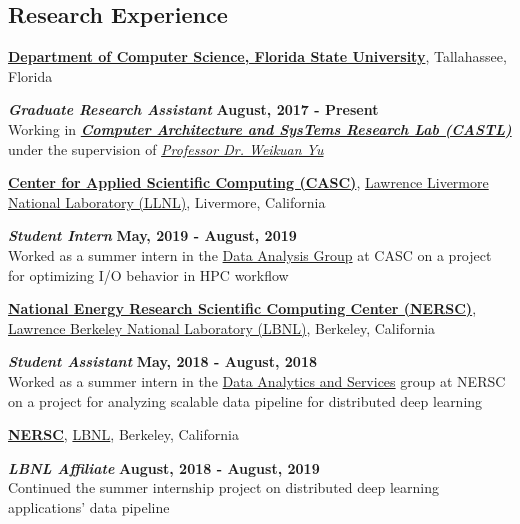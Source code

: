 \documentclass[margin,line]{res}
\begin{document}
\begin{resume}
\vspace*{-.1in}

\section{\sc Research Experience}
{\bf \href{http://www.cs.fsu.edu/}{Department of Computer Science, Florida State University}}, Tallahassee, Florida

\vspace{-.4cm}
\textbf{{\em Graduate Research Assistant}} \hfill {\bf August, 2017 - Present}\\
Working in \textbf{\textit{\href{http://castl.cs.fsu.edu/doku.php/}{Computer Architecture and SysTems Research Lab (CASTL)}}} under the supervision of \textit{\href{https://www.cs.fsu.edu/~yuw/}{Professor Dr. Weikuan Yu}}

\vspace{-.2cm}

{\bf \href{https://computing.llnl.gov/casc}{Center for Applied Scientific Computing (CASC)}}, \href{http://www.llnl.gov/}{Lawrence Livermore National Laboratory (LLNL)}, Livermore, California

\vspace{-.4cm}
\textbf{{\em Student Intern}} \hfill {\bf May, 2019 - August, 2019}\\
Worked as a summer intern in the \href{https://computing.llnl.gov/casc/data-analysis-group}{Data Analysis Group} at CASC on a project for optimizing I/O behavior in HPC workflow

\vspace{-.2cm}
{\bf \href{http://www.nersc.gov/}{National Energy Research Scientific Computing Center (NERSC)}}, \href{http://www.lbl.gov/}{Lawrence Berkeley National Laboratory (LBNL)}, Berkeley, California

\vspace{-.4cm}
\textbf{{\em Student Assistant}} \hfill {\bf May, 2018 - August, 2018}\\
Worked as a summer intern in the \href{http://www.nersc.gov/users/data-analytics/}{Data Analytics and Services} group at NERSC on a project for analyzing scalable data pipeline for distributed deep learning

\vspace{-.2cm}
{\bf \href{http://www.nersc.gov/}{NERSC}}, \href{http://www.lbl.gov/}{LBNL}, Berkeley, California

\vspace{-.4cm}
\textbf{{\em LBNL Affiliate}} \hfill {\bf August, 2018 - August, 2019}\\
Continued the summer internship project on distributed deep learning applications' data pipeline


\end{resume}
\end{document}
